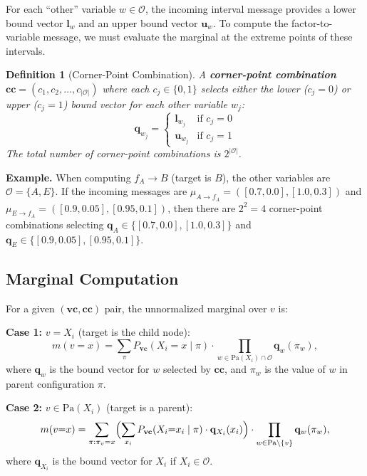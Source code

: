 \documentclass{article}
\newtheorem{definition}{Definition}
\begin{document}
For each ``other'' variable $w \in \mathcal{O}$, the incoming interval message provides
a lower bound vector $\mathbf{l}_w$ and an upper bound vector $\mathbf{u}_w$. To
compute the factor-to-variable message, we must evaluate the marginal at the extreme
points of these intervals.

\begin{definition}[Corner-Point Combination]
A \textbf{corner-point combination} $\mathbf{cc} = (c_1, c_2, \dots, c_{|\mathcal{O}|})$ where each $c_j \in \{0, 1\}$
selects either the \emph{lower} ($c_j = 0$) or \emph{upper} ($c_j = 1$) bound vector
for each other variable $w_j$:
\[
  \mathbf{q}_{w_j} = \begin{cases}
    \mathbf{l}_{w_j} & \text{if } c_j = 0 \\
    \mathbf{u}_{w_j} & \text{if } c_j = 1
  \end{cases}
\]
The total number of corner-point combinations is $2^{|\mathcal{O}|}$.
\end{definition}

\textbf{Example.} When computing $f_A \to B$ (target is $B$), the other variables are
$\mathcal{O} = \{A, E\}$. If the incoming messages are $\mu_{A \to f_A} = ([0.7, 0.0], [1.0, 0.3])$
and $\mu_{E \to f_A} = ([0.9, 0.05], [0.95, 0.1])$, then there are $2^2 = 4$ corner-point
combinations selecting $\mathbf{q}_A \in \{[0.7, 0.0], [1.0, 0.3]\}$ and
$\mathbf{q}_E \in \{[0.9, 0.05], [0.95, 0.1]\}$.

\subsection{Marginal Computation}

For a given $(\mathbf{vc}, \mathbf{cc})$ pair, the unnormalized marginal over $v$ is:

\medskip
\noindent\textbf{Case 1:} $v = X_i$ (target is the child node):
\begin{equation}\label{eq:case1}
  m(v{=}x) = \sum_{\pi} P_{\mathbf{vc}}(X_i{=}x \mid \pi)
  \cdot \prod_{w \in \mathrm{Pa}(X_i) \cap \mathcal{O}} \mathbf{q}_w(\pi_w),
\end{equation}
where $\mathbf{q}_w$ is the bound vector for $w$ selected by $\mathbf{cc}$, and
$\pi_w$ is the value of $w$ in parent configuration $\pi$.

\medskip
\noindent\textbf{Case 2:} $v \in \mathrm{Pa}(X_i)$ (target is a parent):
\begin{equation}\label{eq:case2}
  m(v{=}x) = \sum_{\pi : \pi_v = x}
  \Bigl(\sum_{x_i} P_{\mathbf{vc}}(X_i{=}x_i \mid \pi) \cdot \mathbf{q}_{X_i}(x_i)\Bigr)
  \cdot \prod_{w \in \mathrm{Pa} \setminus \{v\}} \mathbf{q}_w(\pi_w),
\end{equation}
where $\mathbf{q}_{X_i}$ is the bound vector for $X_i$ if $X_i \in \mathcal{O}$.
\end{document}
